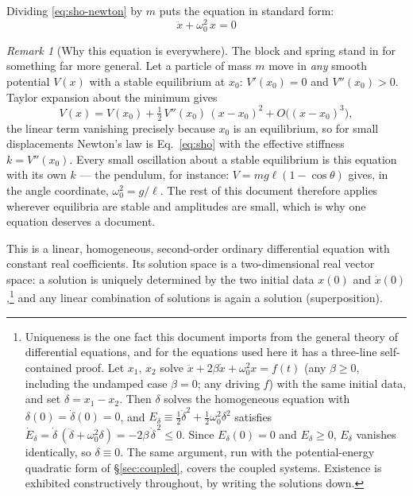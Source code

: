 \documentclass[11pt]{article}
\theoremstyle{plain}
\theoremstyle{definition}
\theoremstyle{remark}
\newtheorem{remark}[lemma]{Remark}
\begin{document}
Dividing \eqref{eq:sho-newton} by $m$ puts the equation in standard form:
\begin{equation}
  \boxed{\;\ddot x + \omega_0^2\, x = 0\;}
  \label{eq:sho}
\end{equation}

\begin{remark}[Why this equation is everywhere]\label{rem:universality}
The block and spring stand in for something far more general. Let a
particle of mass $m$ move in \emph{any} smooth potential $V(x)$ with a
stable equilibrium at $x_0$: $V'(x_0) = 0$ and $V''(x_0) > 0$. Taylor
expansion about the minimum gives
\begin{equation}
  V(x) = V(x_0) + \tfrac12\,V''(x_0)\,(x-x_0)^2 + O\bigl((x-x_0)^3\bigr),
\end{equation}
the linear term vanishing precisely because $x_0$ is an equilibrium, so
for small displacements Newton's law is Eq.~\eqref{eq:sho} with the
effective stiffness $k = V''(x_0)$. Every small oscillation about a
stable equilibrium is this equation with its own $k$ --- the pendulum,
for instance: $V = mg\ell(1-\cos\theta)$ gives, in the angle
coordinate, $\omega_0^2 = g/\ell$. The rest of this document therefore
applies wherever equilibria are stable and amplitudes are small, which
is why one equation deserves a document.
\end{remark}

This is a linear, homogeneous, second-order ordinary differential equation
with constant real coefficients. Its solution space is a two-dimensional real
vector space: a solution is uniquely determined by the two initial data
$x(0)$ and $\dot x(0)$,\footnote{Uniqueness is the one fact this document
imports from the general theory of differential equations, and for the
equations used here it has a three-line self-contained proof. Let $x_1$,
$x_2$ solve $\ddot x + 2\beta\dot x + \omega_0^2 x = f(t)$ (any
$\beta \ge 0$, including the undamped case $\beta = 0$; any driving $f$)
with the same initial data, and set $\delta = x_1 - x_2$. Then $\delta$
solves the homogeneous equation with $\delta(0) = \dot\delta(0) = 0$, and
$E_\delta \equiv \tfrac12\dot\delta^2 + \tfrac12\omega_0^2\delta^2$
satisfies $\dot E_\delta = \dot\delta\,(\ddot\delta + \omega_0^2\delta)
= -2\beta\,\dot\delta^{\,2} \le 0$. Since $E_\delta(0) = 0$ and
$E_\delta \ge 0$, $E_\delta$ vanishes identically, so $\delta \equiv 0$.
The same argument, run with the potential-energy quadratic form of
\S\ref{sec:coupled}, covers the coupled systems. Existence is exhibited
constructively throughout, by writing the solutions down.} and any linear
combination of solutions is again a
solution (superposition).
\end{document}
